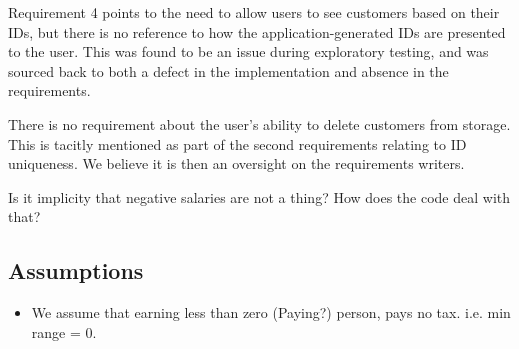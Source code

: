 Requirement 4 points to the need to allow users to see customers based on their IDs, but there is no reference to how the application-generated IDs are presented to the user. This was found to be an issue during exploratory testing, and was sourced back to both a defect in the implementation and absence in the requirements. 

There is no requirement about the user's ability to delete customers from storage. This is tacitly mentioned as part of the second requirements relating to ID uniqueness. We believe it is then an oversight on the requirements writers. 

Is it implicity that negative salaries are not a thing? How does the code deal with that? 

\subsection{Assumptions}


\begin{itemize}
	\item We assume that earning less than zero (Paying?) person, pays no tax. i.e. min range = 0. 
\end{itemize}

